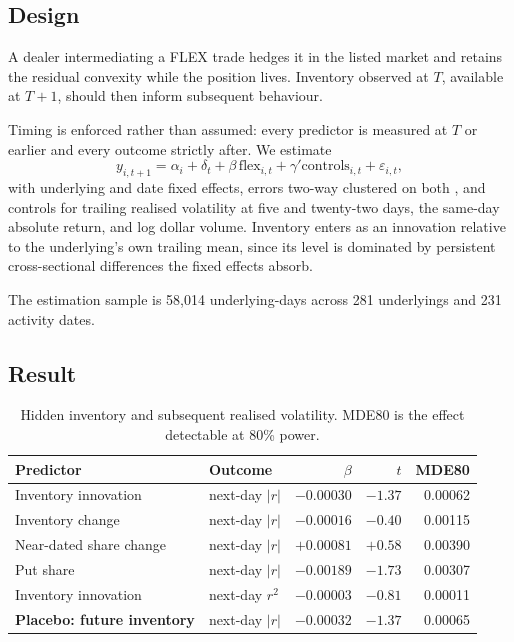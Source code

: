 \documentclass[11pt]{article}
\begin{document}
\subsection{Design}

A dealer intermediating a FLEX trade hedges it in the listed market and retains the
residual convexity while the position lives. Inventory observed at $T$, available at
$T+1$, should then inform subsequent behaviour.

Timing is enforced rather than assumed: every predictor is measured at $T$ or earlier
and every outcome strictly after. We estimate
\begin{equation}
y_{i,t+1}
= \alpha_i + \delta_t
+ \beta\,\text{flex}_{i,t}
+ \gamma' \text{controls}_{i,t}
+ \varepsilon_{i,t},
\label{eq:pred}
\end{equation}
with underlying and date fixed effects, errors two-way clustered on both
\citep{cameron2011}, and controls for trailing realised volatility at five and
twenty-two days, the same-day absolute return, and log dollar volume. Inventory enters
as an innovation relative to the underlying's own trailing mean, since its level is
dominated by persistent cross-sectional differences the fixed effects absorb.

The estimation sample is 58,014 underlying-days across 281 underlyings and 231 activity
dates.

\subsection{Result}

\begin{table}[t]
\centering
\caption{Hidden inventory and subsequent realised volatility. MDE80 is the effect
detectable at 80\% power.}
\label{tab:pred}
\begin{tabular}{llrrr}
\toprule
Predictor & Outcome & $\beta$ & $t$ & MDE80 \\
\midrule
Inventory innovation & next-day $|r|$ & $-0.00030$ & $-1.37$ & 0.00062 \\
Inventory change & next-day $|r|$ & $-0.00016$ & $-0.40$ & 0.00115 \\
Near-dated share change & next-day $|r|$ & $+0.00081$ & $+0.58$ & 0.00390 \\
Put share & next-day $|r|$ & $-0.00189$ & $-1.73$ & 0.00307 \\
Inventory innovation & next-day $r^2$ & $-0.00003$ & $-0.81$ & 0.00011 \\
\midrule
\textbf{Placebo: future inventory} & next-day $|r|$ & $\mathbf{-0.00032}$ & $\mathbf{-1.37}$ & 0.00065 \\
\bottomrule
\end{tabular}
\end{table}
\end{document}
